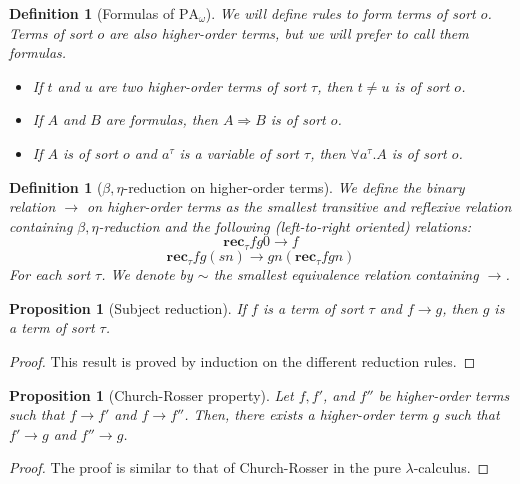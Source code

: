 \documentclass[a4paper,12pt]{article}
\newtheorem{prop}[theo]{Proposition}
\newtheorem{defi}[theo]{Definition}
\theoremstyle{rmqstyle}
\newcommand{\PA}{\mathrm{PA}}
\newcommand{\rec}{\mathbf{rec}}
\renewcommand{\implies}{\Rightarrow}
\begin{document}
\begin{defi}[Formulas of $\PA_\omega$]
We will define rules to form terms of sort $o$. Terms of sort $o$ are also higher-order terms, but we will prefer to call them formulas.
\begin{itemize}
\setlength\itemsep{ -1 em}
\item If $t$ and $u$ are two higher-order terms of sort $\tau$, then $t \neq u$ is of sort $o$.\\
\item If $A$ and $B$ are formulas, then $A \implies B$ is of sort $o$.\\
\item If $A$ is of sort $o$ and $a^\tau$ is a variable of sort $\tau$, then $\forall a^\tau. A$ is of sort $o$.
\end{itemize}
\end{defi}

\begin{defi}[$\beta, \eta$-reduction on higher-order terms]
We define the binary relation $\longrightarrow$ on higher-order terms as the smallest transitive and reflexive relation containing $\beta, \eta$-reduction and the following (left-to-right oriented) relations:
$$ \rec_\tau f g 0 \longrightarrow f$$
$$\rec_\tau f g (sn) \longrightarrow g n (\rec_\tau f g n)$$
For each sort $\tau$. We denote by $\sim$ the smallest equivalence relation containing $\longrightarrow$.
\end{defi}

\begin{prop}[Subject reduction]
If $f$ is a term of sort $\tau$ and $f \longrightarrow g$, then $g$ is a term of sort $\tau$. 
\end{prop}

\begin{proof}
This result is proved by induction on the different reduction rules. 
\end{proof}

\begin{prop}[Church-Rosser property]
Let $f, f'$, and $f''$ be higher-order terms such that $f \longrightarrow f'$ and $f \longrightarrow f''$. Then, there exists a higher-order term $g$ such that $f' \longrightarrow g$ and $f'' \longrightarrow g$.
\end{prop}

\begin{proof}
The proof is similar to that of Church-Rosser in the pure $\lambda$-calculus.
\end{proof}
\end{document}
